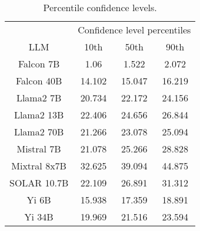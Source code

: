 \begin{table*}
\centering
\begin{tabular}{c|c|c|c}
& \multicolumn{3}{c}{Confidence level percentiles} \\ 
LLM & 10th & 50th & 90th\\ \hline
Falcon 7B & 1.06 & 1.522 & 2.072\\
Falcon 40B & 14.102 & 15.047 & 16.219\\
Llama2 7B & 20.734 & 22.172 & 24.156\\
Llama2 13B & 22.406 & 24.656 & 26.844\\
Llama2 70B & 21.266 & 23.078 & 25.094\\
Mistral 7B & 21.078 & 25.266 & 28.828\\
Mixtral 8x7B & 32.625 & 39.094 & 44.875\\
SOLAR 10.7B & 22.109 & 26.891 & 31.312\\
Yi 6B & 15.938 & 17.359 & 18.891\\
Yi 34B & 19.969 & 21.516 & 23.594\\
\hline
\end{tabular}
\caption{Percentile confidence levels.}
\label{tab:percentile_conf}
\end{table*}
